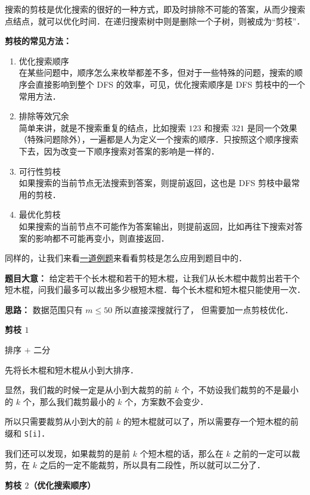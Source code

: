 搜索的剪枝是优化搜索的很好的一种方式，即及时排除不可能的答案，从而少搜索点结点，就可以优化时间．在递归搜索树中则是删除一个子树，则被成为“剪枝”．

\textbf{剪枝的常见方法：}

\begin{enumerate}
\item 优化搜索顺序\\
在某些问题中，顺序怎么来枚举都差不多，但对于一些特殊的问题，搜索的顺序会直接影响到整个 DFS 的效率，可见，优化搜索顺序是 DFS 剪枝中的一个常用方法．

\item 排除等效冗余 \\
简单来讲，就是不搜索重复的结点，比如搜索 $123$ 和搜索 $321$ 是同一个效果（特殊问题除外），一遍都是人为定义一个搜索的顺序．只按照这个顺序搜索下去，因为改变一下顺序搜索对答案的影响是一样的．

\item 可行性剪枝\\
如果搜索的当前节点无法搜索到答案，则提前返回，这也是 DFS 剪枝中最常用的剪枝．

\item 最优化剪枝 \\
如果搜索的当前节点不可能作为答案输出，则提前返回，比如再往下搜索对答案的影响都不可能再变小，则直接返回．
\end{enumerate}

同样的，让我们来看\href{https://loj.ac/p/2148}{一道例题}来看看剪枝是怎么应用到题目中的．

\textbf{题目大意：}
给定若干个长木棍和若干的短木棍，让我们从长木棍中裁剪出若干个短木棍，问我们最多可以裁出多少根短木棍．每个长木棍和短木棍只能使用一次．

\textbf{思路：}
数据范围只有 $m\leq50$ 所以直接深搜就行了， 但需要加一点剪枝优化．


\textbf{剪枝 $1$}

排序 $+$ 二分 

先将长木棍和短木棍从小到大排序．

显然，我们裁的时候一定是从小到大裁剪的前 $k$ 个，不妨设我们裁剪的不是最小的 $k$ 个，那么我们裁剪最小的 $k$ 个，方案数不会变少．

所以只需要裁剪从小到大的前 $k$ 的短木棍就可以了，所以需要存一个短木棍的前缀和 \verb|S[i]|．

我们还可以发现，如果裁剪的是前 $k$ 个短木棍的话，那么在 $k$ 之前的一定可以裁剪，在 $k$ 之后的一定不能裁剪，所以具有二段性，所以就可以二分了．	

\textbf{剪枝 $2$（优化搜索顺序）}

